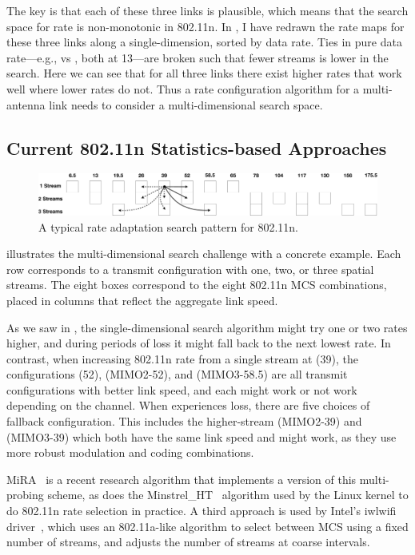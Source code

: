 The key is that each of these three links is plausible, which means that the search space for rate is non-monotonic in 802.11n. In , I have redrawn the rate maps for these three links along a single-dimension, sorted by data rate. Ties in pure data rate---e.g.,  vs , both at 13\Mbps---are broken such that fewer streams is lower in the search. Here we can see that for all three links there exist higher rates that work well where lower rates do not. Thus a rate configuration algorithm for a multi-antenna link needs to consider a multi-dimensional search space.

\subsection{Current 802.11n Statistics-based Approaches}
\begin{figure}[t]
      \centering
      \includegraphics[width=\textwidth]{figures/approach_figs/search_11n.pdf}
      \caption[Rate adaptation search pattern for 802.11n]{\label{fig:search_11n}A typical rate adaptation search pattern for 802.11n.}
\end{figure}
 illustrates the multi-dimensional search challenge with a concrete example. Each row corresponds to a transmit configuration with one, two, or three spatial streams. The eight boxes correspond to the eight 802.11n MCS combinations, placed in columns that reflect the aggregate link speed.

As we saw in , the single-dimensional search algorithm might try one or two rates higher, and during periods of loss it might fall back to the next lowest rate. In contrast, when increasing 802.11n rate from a single stream at  (39\Mbps), the configurations  (52\Mbps),  (MIMO2-52\Mbps), and  (MIMO3-58.5\Mbps) are all transmit configurations with better link speed, and each might work or not work depending on the channel. When  experiences loss, there are five choices of fallback configuration. This includes the higher-stream  (MIMO2-39\Mbps) and  (MIMO3-39\Mbps) which both have the same link speed and might work, as they use more robust modulation and coding combinations.

MiRA~\cite{Pefkianakis_MiRA} is a recent research algorithm that implements a version of this multi-probing scheme, as does the Minstrel\_HT~\cite{Minstrel_HT} algorithm used by the Linux kernel to do 802.11n rate selection in practice. A third approach is used by Intel's iwlwifi driver~\cite{iwlwifi}, which uses an 802.11a-like algorithm to select between MCS using a fixed number of streams, and adjusts the number of streams at coarse intervals.

